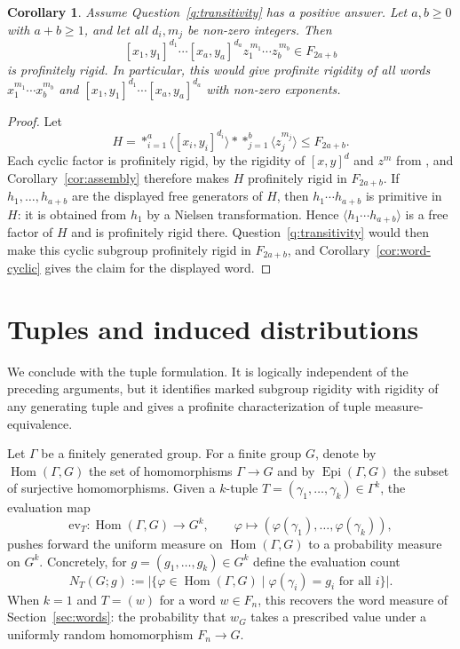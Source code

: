 \documentclass[11pt]{amsart}
\theoremstyle{plain}
\newtheorem{corollary}[theorem]{Corollary}
\theoremstyle{definition}
\newcommand{\Hom}{\operatorname{Hom}}
\newcommand{\Epi}{\operatorname{Epi}}
\begin{document}
\begin{corollary}\label{cor:conditional-surface}
Assume Question~\ref{q:transitivity} has a positive answer. Let $a,b\ge0$ with
$a+b\ge1$, and let all $d_i,m_j$ be non-zero integers. Then
\[
  [x_1,y_1]^{d_1}\cdots[x_a,y_a]^{d_a}
  z_1^{\,m_1}\cdots z_b^{\,m_b}\in F_{2a+b}
\]
is profinitely rigid. In particular, this would give profinite rigidity of all
words $x_1^{m_1}\cdots x_b^{m_b}$ and
$[x_1,y_1]^{d_1}\cdots[x_a,y_a]^{d_a}$ with non-zero exponents.
\end{corollary}

\begin{proof}
Let
\[
  H=\mathop{\ast}_{i=1}^{a}\langle [x_i,y_i]^{d_i}\rangle
    *\mathop{\ast}_{j=1}^{b}\langle z_j^{m_j}\rangle
  \le F_{2a+b}.
\]
Each cyclic factor is profinitely rigid, by the rigidity of
$[x,y]^d$ and $z^m$ from \cite{HMP}, and Corollary~\ref{cor:assembly} therefore makes $H$
profinitely rigid in $F_{2a+b}$. If $h_1,\dots,h_{a+b}$ are the displayed free
generators of $H$, then $h_1\cdots h_{a+b}$ is primitive in $H$: it is obtained
from $h_1$ by a Nielsen transformation. Hence
$\langle h_1\cdots h_{a+b}\rangle$ is a free factor of $H$ and is profinitely
rigid there. Question~\ref{q:transitivity} would then make this cyclic subgroup
profinitely rigid in $F_{2a+b}$, and Corollary~\ref{cor:word-cyclic} gives the
claim for the displayed word.
\end{proof}


\section{Tuples and induced distributions}\label{sec:tuples}


We conclude with the tuple formulation.  It is logically independent of the
preceding arguments, but it identifies marked subgroup rigidity with rigidity of
any generating tuple and gives a profinite characterization of tuple
measure-equivalence.

Let $\Gamma$ be a finitely generated group.  For a finite group $G$, denote by
$\Hom(\Gamma,G)$ the set of homomorphisms $\Gamma\to G$ and by
$\Epi(\Gamma,G)$ the subset of surjective homomorphisms.  Given a $k$-tuple
$T=(\gamma_1,\dots,\gamma_k)\in\Gamma^{k}$, the evaluation map
\[
  \mathrm{ev}_T\colon\Hom(\Gamma,G)\longrightarrow G^{k},\qquad
  \varphi\mapsto(\varphi(\gamma_1),\dots,\varphi(\gamma_k)),
\]
pushes forward the uniform measure on $\Hom(\Gamma,G)$ to a probability measure
on $G^{k}$.  Concretely, for $g=(g_1,\dots,g_k)\in G^{k}$ define the evaluation
count
\[
  N_T(G;g):=\bigl|\{\varphi\in\Hom(\Gamma,G)\mid \varphi(\gamma_i)=g_i
  \text{ for all }i\}\bigr| .
\]
When $k=1$ and $T=(w)$ for a word $w\in F_n$, this recovers the word measure of
Section~\ref{sec:words}: the probability that $w_G$ takes a prescribed value
under a uniformly random homomorphism $F_n\to G$.
\end{document}
